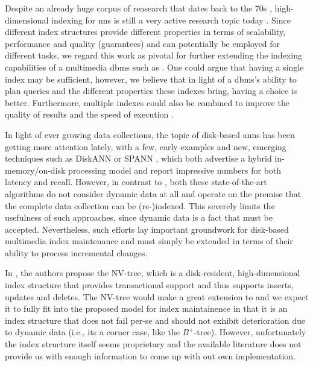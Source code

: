 Despite an already huge corpus of reasearch that dates back to the 70s \cite{Bentley:1975Multidimensional,Guttmann:1984RTrees,Beckmann:1990RTree,Indyk1998:Approximate,Weber:1998Va,Jegou:2010Product}, high-dimensional indexing for \acrshort{nns} is still a very active research topic today \cite{Shimomura:2021Survey,Kraska:2018Case}. Since different index structures provide different properties in terms of scalability, performance and quality (guarantees) and can potentially be employed for different tasks, we regard this work as pivotal for further extending the indexing capabilities of a multimedia \acrshort{dbms} such as \cottontail{}. One could argue that having a single index may be sufficient, however, we believe that in light of a \acrshort{dbms}'s ability to plan queries and the different properties these indexes bring, having a choice is better. Furthermore, multiple indexes could also be combined to improve the quality of results and the speed of execution \cite{Giangreco:2018Database}.

In light of ever growing data collections, the topic of disk-based \acrshort{anns} has been getting more attention lately, with a few, early examples \cite{Lejsek:2011NVTree,Lejsek:2009NVTree,Gudmundsson:2010Large} and new, emerging techniques such as DiskANN \cite{Jayaram:2019DiskANN} or SPANN \cite{Chen:2021SPANN}, which both advertise a hybrid in-memory/on-disk processing model and report impressive numbers for both latency and recall. However, in contrast to \cite{Lejsek:2011NVTree,Lejsek:2009NVTree}, both these state-of-the-art algorithms do not consider dynamic data at all and operate on the premise that the complete data collection can be (re-)indexed. This severely limits the usefulness of such approaches, since dynamic data is a fact that must be accepted. Nevertheless, such efforts lay important groundwork for disk-based multimedia index maintenance and must simply be extended in terms of their ability to process incremental changes.

In \cite{Lejsek:2011NVTree,Lejsek:2009NVTree}, the authors propose the NV-tree, which is a disk-resident, high-dimensional index structure that provides transactional support \cite{Lejsek:2018Transactional} and thus supports inserts, updates and deletes. The NV-tree would make a great extension to \cottontail{} and we expect it to fully fit into the proposed model for index maintainence in that it is an index structure that does not fail per-se and should not exhibit deterioration due to dynamic data (i.e., its a corner case, like the $B^{+}$-tree). However, unfortunately the index structure itself seems proprietary and the available literature does not provide us with enough information to come up with out own implementation.

